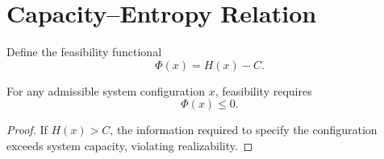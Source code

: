 \section{Capacity--Entropy Relation}

Define the feasibility functional
\[
\Phi(x) = H(x) - C .
\]

\begin{theorem}
For any admissible system configuration \(x\), feasibility requires
\[
\Phi(x) \le 0 .
\]
\end{theorem}

\begin{proof}
If \(H(x) > C\), the information required to specify the configuration exceeds system capacity, violating realizability.
\end{proof}
